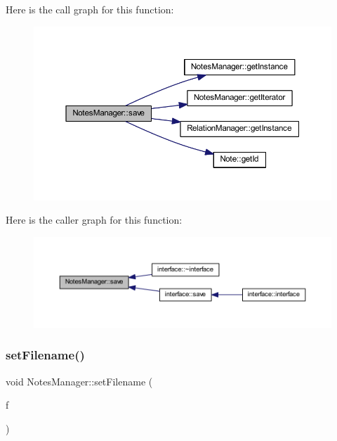 Here is the call graph for this function\+:\nopagebreak
\begin{figure}[H]
\begin{center}
\leavevmode
\includegraphics[width=350pt]{class_notes_manager_ad271bd7f8079b01b04a32b886b498bac_cgraph}
\end{center}
\end{figure}
Here is the caller graph for this function\+:\nopagebreak
\begin{figure}[H]
\begin{center}
\leavevmode
\includegraphics[width=350pt]{class_notes_manager_ad271bd7f8079b01b04a32b886b498bac_icgraph}
\end{center}
\end{figure}
\mbox{\label{class_notes_manager_a797d858176de3f5e64aa8194797909fb}} 
\subsubsection{\texorpdfstring{set\+Filename()}{setFilename()}}
{\footnotesize\ttfamily void Notes\+Manager\+::set\+Filename (\begin{DoxyParamCaption}\item[{const Q\+String}]{f }\end{DoxyParamCaption})\hspace{0.3cm}{\ttfamily [inline]}}



